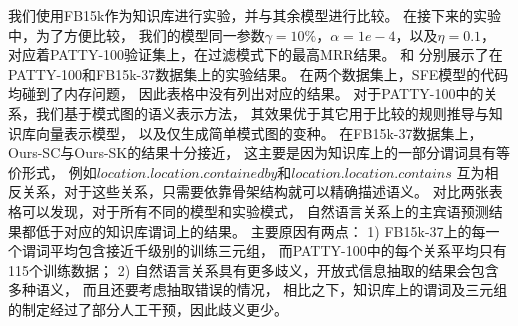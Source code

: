 
我们使用FB15k作为知识库进行实验，并与其余模型进行比较。
在接下来的实验中，为了方便比较，
我们的模型同一参数$\gamma=10\%$，$\alpha=1e-4$，以及$\eta=0.1$，
对应着PATTY-100验证集上，在过滤模式下的最高MRR结果。
和
分别展示了在PATTY-100和FB15k-37数据集上的实验结果。
在两个数据集上，SFE模型的代码均碰到了内存问题，
因此表格中没有列出对应的结果。
对于PATTY-100中的关系，我们基于模式图的语义表示方法，
其效果优于其它用于比较的规则推导与知识库向量表示模型，
以及仅生成简单模式图的变种。
在FB15k-37数据集上，Ours-SC与Ours-SK的结果十分接近，
这主要是因为知识库上的一部分谓词具有等价形式，
例如$location.location.containedby$和$location.location.contains$
互为相反关系，对于这些关系，只需要依靠骨架结构就可以精确描述语义。
对比两张表格可以发现，对于所有不同的模型和实验模式，
自然语言关系上的主宾语预测结果都低于对应的知识库谓词上的结果。
主要原因有两点：
1) FB15k-37上的每一个谓词平均包含接近千级别的训练三元组，
而PATTY-100中的每个关系平均只有115个训练数据；
2) 自然语言关系具有更多歧义，开放式信息抽取的结果会包含多种语义，
而且还要考虑抽取错误的情况，
相比之下，知识库上的谓词及三元组的制定经过了部分人工干预，因此歧义更少。


